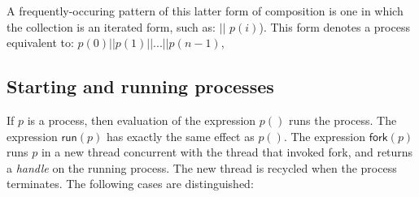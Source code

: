 \documentclass[12pt]{IOS-Book-Article-CPA-2017}
\begin{document}
A frequently-occuring pattern of this latter form of
composition is one in which the collection is an iterated form, such as:
$\mathrel{||}$   $p(i)$\textsc{)}.
This form denotes a process equivalent to: $p(0)\mathrel{||} p(1) \mathrel{||} ... \mathrel{||}p(n-1)$,

\subsection{Starting and running processes}
\label{Starting and running processes}
If $p$ is a process, then evaluation of the expression $p()$ runs the process.\note
{The expression $\mathsf{run}(p)$ has exactly the same effect as $p()$. 
The expression $\mathsf{fork}(p)$ runs $p$  in a new thread concurrent with the 
thread that invoked \textsf{fork}, and returns a \textit{handle} on the running process. The new thread is recycled when the process terminates.}
The following cases are distinguished:
\end{document}
